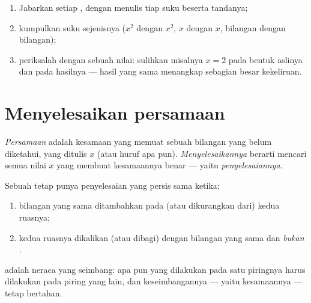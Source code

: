 \begin{method}\label{met:g8:equations:reduce}
\begin{enumerate}
  \item Jabarkan setiap , dengan menulis tiap suku
        beserta tandanya;
  \item kumpulkan suku sejenisnya ($x^2$ dengan $x^2$, $x$ dengan
        $x$, bilangan dengan bilangan);
  \item periksalah dengan sebuah nilai: sulihkan misalnya $x = 2$
        pada bentuk aslinya dan pada hasilnya --- hasil yang sama
        menangkap sebagian besar kekeliruan.
\end{enumerate}
\end{method}

\section{Menyelesaikan persamaan}

\begin{definition}[Persamaan]\label{def:g8:equations:def}
\emph{Persamaan} adalah kesamaan yang memuat sebuah
bilangan yang belum diketahui, yang ditulis $x$ (atau huruf apa pun).
\emph{Menyelesaikannya} berarti mencari semua nilai $x$ yang membuat
kesamaannya benar --- yaitu \emph{penyelesaiannya}.
\end{definition}

\begin{theorem}\label{thm:g8:equations:balance}
Sebuah  tetap punya penyelesaian yang persis sama ketika:
\begin{enumerate}
  \item bilangan yang sama ditambahkan pada (atau dikurangkan dari)
        kedua ruasnya;
  \item kedua ruasnya dikalikan (atau dibagi) dengan bilangan yang
        sama dan \emph{bukan }.
\end{enumerate}
\end{theorem}
\admitted

\begin{omfigure}

{\small {} adalah neraca yang seimbang: apa pun yang dilakukan
pada satu piringnya harus dilakukan pada piring yang lain, dan
keseimbangannya --- yaitu kesamaannya --- tetap bertahan.}
\end{omfigure}

